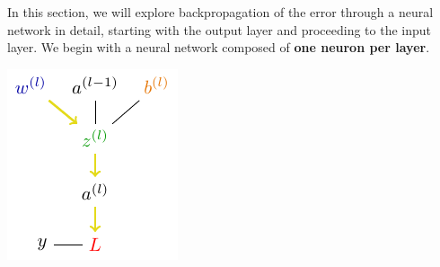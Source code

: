 In this section, we will explore backpropagation of the error through a neural network in detail, starting with the output layer and proceeding to the input layer. We begin with a neural network composed of \textbf{one neuron per layer}.

\begin{minipage}{0.45\textwidth}
\includegraphics[width=\textwidth]{tikz/chapter3 - Chain Rule One Layer.pdf}
\end{minipage}

